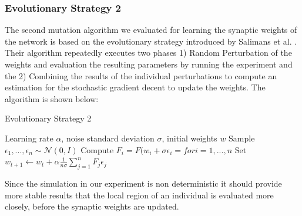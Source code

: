 \subsubsection{Evolutionary Strategy 2}
\label{sec:strategie_2}
The second mutation algorithm we evaluated for learning the synaptic weights of the network is based on the evolutionary strategy introduced by Salimans et al. \cite{Salimans2017EvolutionSA}. Their algorithm repeatedly executes two phases 1) Random Perturbation of the weights and evaluation the resulting parameters by running the experiment and the 2) Combining the results of the individual perturbations to compute an estimation for the stochastic gradient decent to update the weights. The algorithm is shown below: 
\begin{algorithm}
	\caption{Evolutionary Strategy 2}
	\begin{algorithmic}[1]
		\renewcommand{\algorithmicrequire}{\textbf{Input:}}
		\REQUIRE Learning rate $\alpha$, noise standard deviation $\sigma$, initial weights $w$
		\STATE Sample $\epsilon_{1},...,\epsilon_{n} \sim \mathcal{N}\left( 0, I \right)$
		\STATE Compute $F_{ i } = F(w_{ i } + \sigma \epsilon_{ i }= for i = 1, ..., n$
		\STATE Set $w_{ t+1 } \leftarrow  w_{ t }+ \alpha \frac{ 1 }{ n \sigma } \sum_{ j = 1 }^{ n }{F_{ j } \epsilon_{ j }  }$
		\ENDFOR
	\end{algorithmic} 
\end{algorithm}

Since the simulation in our experiment is non deterministic it should provide more stable results that the local region of an individual is evaluated more closely, before the synaptic weights are updated.
